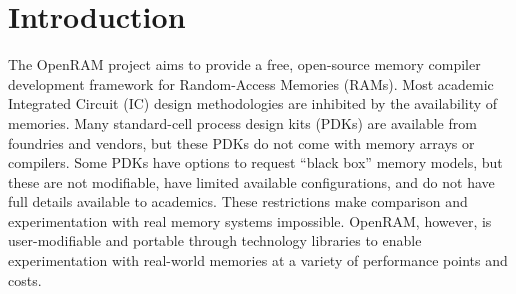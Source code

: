 \section{Introduction}
\label{sec:intro}

The OpenRAM project aims to provide a free, open-source memory
compiler development framework for Random-Access Memories (RAMs).
Most academic Integrated Circuit (IC) design methodologies are
inhibited by the availability of memories.  Many standard-cell process
design kits (PDKs) are available from foundries and vendors, but these
PDKs do not come with memory arrays or compilers. Some PDKs have
options to request ``black box'' memory models, but these are not
modifiable, have limited available configurations, and do not have
full details available to academics. These restrictions make
comparison and experimentation with real memory systems impossible.
OpenRAM, however, is user-modifiable and portable through
technology libraries to enable experimentation with real-world
memories at a variety of performance points and costs.

